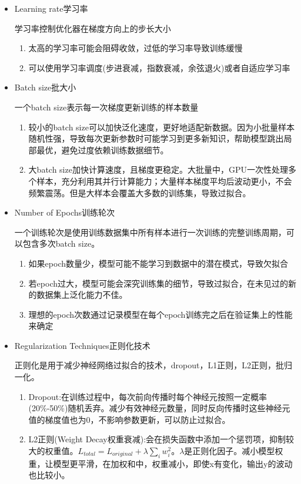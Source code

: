 \documentclass[UTF8]{ctexart}
\begin{document}
\begin{itemize}
\begin{itemize}
\begin{enumerate}
\begin{itemize}
        \end{itemize}
    \end{enumerate}
    \item Learning rate学习率
    
    学习率控制优化器在梯度方向上的步长大小
    \begin{enumerate}
        \item 太高的学习率可能会阻碍收敛，过低的学习率导致训练缓慢
        \item 可以使用学习率调度(步进衰减，指数衰减，余弦退火)或者自适应学习率
    \end{enumerate}

    \item Batch size批大小
    
    一个batch size表示每一次梯度更新训练的样本数量

    \begin{enumerate}
        \item 较小的batch size可以加快泛化速度，更好地适配新数据。因为小批量样本随机性强，导致每次更新参数时可能学习到更多新知识，帮助模型跳出局部最优，避免过度依赖训练数据细节。
        \item 大batch size加快计算速度，且梯度更稳定。大批量中，GPU一次性处理多个样本，充分利用其并行计算能力；大量样本梯度平均后波动更小，不会频繁震荡。但是大样本会覆盖大多数的训练集，导致过拟合。
    \end{enumerate}

    \item Number of Epochs训练轮次
    
    一个训练轮次是使用训练数据集中所有样本进行一次训练的完整训练周期，可以包含多次batch size。

    \begin{enumerate}
        \item 如果epoch数量少，模型可能不能学习到数据中的潜在模式，导致欠拟合
        \item 若epoch过大，模型可能会深究训练集的细节，导致过拟合，在未见过的新的数据集上泛化能力不佳。
        \item 理想的epoch次数通过记录模型在每个epoch训练完之后在验证集上的性能来确定
    \end{enumerate}

    \item Regularization Techniques正则化技术
    
    正则化是用于减少神经网络过拟合的技术，dropout，L1正则，L2正则，批归一化。

    \begin{enumerate}
        \item Dropout:在训练过程中，每次前向传播时每个神经元按照一定概率(20\%-50\%)随机丢弃。减少有效神经元数量，同时反向传播时这些神经元值的梯度值也为0，不影响参数更新，可以防止过拟合。
        \item L2正则(Weight Decay权重衰减):会在损失函数中添加一个惩罚项，抑制较大的权重值。$L_{total}=L_{original}+\lambda\sum\limits_{i}w_{i}^{2}$。$\lambda$是正则化因子。减小模型权重，让模型更平滑，在加权和中，权重减小，即使x有变化，输出y的波动也比较小。
    \end{enumerate}


\end{itemize}
\end{itemize}
\end{document}
